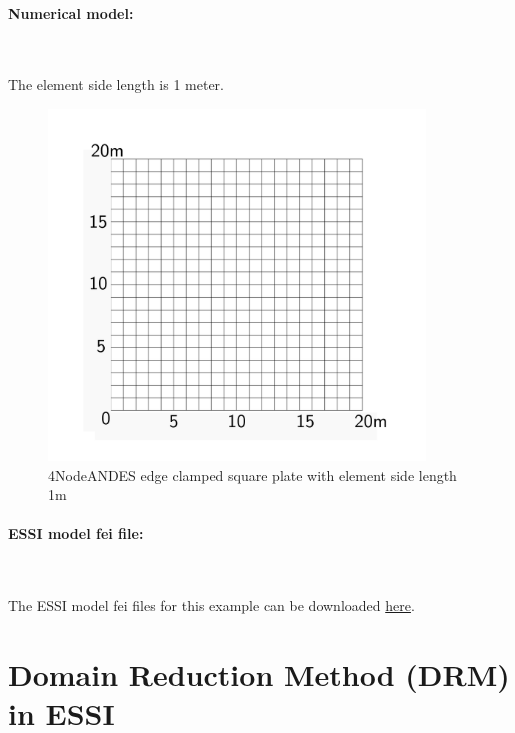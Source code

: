 \documentclass[fleqn,11pt]{article}
\begin{document}
\newpage
\paragraph{Numerical model:} ~

The element side length is 1 meter. 


\begin{figure}[H]
  \centering
  \includegraphics[width=10cm]{../Figure-files/square_plate4_2.pdf}
  \caption{4NodeANDES edge clamped square plate with element side length 1m }
  \label{fig 4NodeANDES edges clamped square plate with element side length 1m }
\end{figure}


\paragraph{ESSI model fei file: } ~




The ESSI model fei files for this example can be downloaded \href{https://github.com/yuan-energy/Real-ESSI-Examples/blob/master/model_fei_file/ANDESshell_square_plate/ANDESshell_square_plate.tgz?raw=true}{here}.




















\newpage
\section{Domain Reduction Method (DRM) in ESSI}
\end{document}
